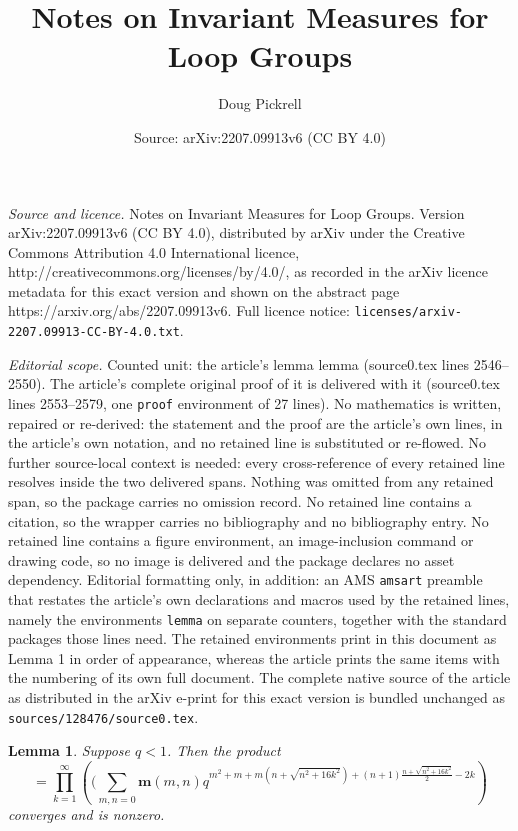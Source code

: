 \documentclass[10pt,a4paper]{amsart}
\title{Notes on Invariant Measures for Loop Groups}
\author{Doug Pickrell}
\date{Source: arXiv:2207.09913v6 (CC BY 4.0)}
\newtheorem{lemma}{Lemma}
\begin{document}
\maketitle

\noindent\emph{Source and licence.} Notes on Invariant Measures for Loop Groups. Version arXiv:2207.09913v6 (CC BY 4.0), distributed by arXiv under the Creative Commons Attribution 4.0 International licence, http://creativecommons.org/licenses/by/4.0/, as recorded in the arXiv licence metadata for this exact version and shown on the abstract page https://arxiv.org/abs/2207.09913v6. Full licence notice: \texttt{licenses/arxiv-2207.09913-CC-BY-4.0.txt}.\par\smallskip

\noindent\textit{Editorial scope.} Counted unit: the article's lemma lemma (source0.tex lines 2546--2550). The article's complete original proof of it is delivered with it (source0.tex lines 2553--2579, one \texttt{proof} environment of 27 lines). No mathematics is written, repaired or re-derived: the statement and the proof are the article's own lines, in the article's own notation, and no retained line is substituted or re-flowed.  No further source-local context is needed: every cross-reference of every retained line resolves inside the two delivered spans.  Nothing was omitted from any retained span, so the package carries no omission record.  No retained line contains a citation, so the wrapper carries no bibliography and no bibliography entry.  No retained line contains a figure environment, an image-inclusion command or drawing code, so no image is delivered and the package declares no asset dependency.  Editorial formatting only, in addition: an AMS \texttt{amsart} preamble that restates the article's own declarations and macros used by the retained lines, namely the environments \texttt{lemma} on separate counters, together with the standard packages those lines need.  The retained environments print in this document as Lemma 1 in order of appearance, whereas the article prints the same items with the numbering of its own full document.  The complete native source of the article as distributed in the arXiv e-print for this exact version is bundled unchanged as \texttt{sources/128476/source0.tex}.
\begin{lemma} Suppose $q<1$. Then the product
$$=\prod_{k=1}^{\infty}\left((\sum_{m,n=0}\mathbf m(m,n)
q^{m^2+m+m(n+\sqrt{n^2+16k^2})+(n+1)\frac{n+\sqrt{n^2+16k^2}}{2}-2k}\right)$$
converges and is nonzero.
\end{lemma}
\end{document}
